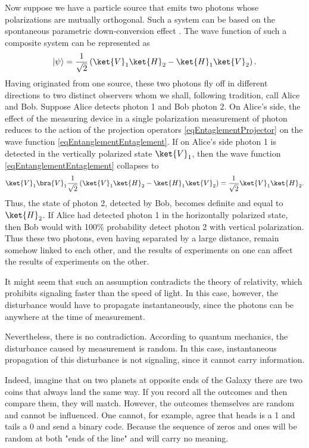 Now suppose we have a particle source that emits two photons whose polarizations are mutually orthogonal. Such a system can be based on the spontaneous 
parametric down-conversion effect \cite{bKlishko}. The wave function of such a composite system 
can be represented as
\begin{equation}
\left|\psi\right> = \frac{1}{\sqrt{2}}\left(
\ket{V}_1\ket{H}_2 - \ket{H}_1\ket{V}_2
\right).
\label{eqEntanglementEntaglement}
\end{equation}
Having originated from one source, these two photons fly off in different directions to two distinct
observers whom we shall, following tradition, call Alice and Bob. Suppose Alice detects photon 1 and 
Bob photon 2. On Alice's side, the effect of the measuring device in a single polarization measurement of 
photon reduces to the action of the projection operators \eqref{eqEntaglementProjector} on 
the wave function \eqref{eqEntanglementEntaglement}. If on Alice's side photon 1 is detected in the
vertically polarized state $\ket{V}_1$, then the wave function \eqref{eqEntanglementEntaglement}
collapses to
\begin{equation}
\ket{V}_1\bra{V}_1 
\frac{1}{\sqrt{2}} \left(
\ket{V}_1\ket{H}_2 - \ket{H}_1\ket{V}_2
\right) = \frac{1}{\sqrt{2}}
\ket{V}_1\ket{H}_2.
\nonumber
\end{equation}
Thus, the state of photon 2, detected by Bob, becomes definite and equal to $\ket{H}_2$.
If Alice had detected photon 1 in the horizontally polarized state, then Bob would with 100\% probability 
detect photon 2 with vertical polarization. Thus these two photons, even having separated by a large 
distance, remain somehow linked to each other, and the results of experiments
on one can affect the results of experiments on the other. 

It might seem that such an assumption contradicts the theory of relativity, which prohibits signaling faster than the speed of light. 
In this case, however, the disturbance would have to propagate instantaneously, since the photons can be anywhere 
at the time of measurement.

Nevertheless, there is no contradiction. According to quantum mechanics, the disturbance caused by measurement is random. In this case,
instantaneous propagation of this disturbance is not signaling, since it cannot carry information.

Indeed, imagine that on two planets at opposite ends of the Galaxy there are two coins that always land the same way. If you record all the outcomes
and then compare them, they will match. However, the outcomes themselves are random and cannot be influenced. One cannot, for example, agree
that heads is a 1 and tails a 0 and send a binary code. Because the sequence of zeros and ones will be random at both "ends of the line"
and will carry no meaning.

